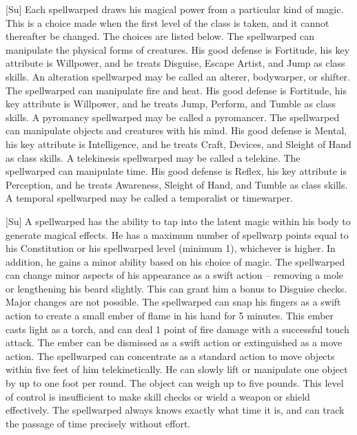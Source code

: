 [Su]
Each spellwarped draws his magical power from a particular kind of magic.
This is a choice made when the first level of the class is taken, and it cannot thereafter be changed.
The choices are listed below.
    The spellwarped can manipulate the physical forms of creatures.
    His good defense is Fortitude, his key attribute is Willpower, and he treats Disguise, Escape Artist, and Jump as class skills.
    An alteration spellwarped may be called an alterer, bodywarper, or shifter.
    The spellwarped can manipulate fire and heat.
    His good defense is Fortitude, his key attribute is Willpower, and he treats Jump, Perform, and Tumble as class skills.
    A pyromancy spellwarped may be called a pyromancer.
    The spellwarped can manipulate objects and creatures with his mind.
    His good defense is Mental, his key attribute is Intelligence, and he treats Craft, Devices, and Sleight of Hand as class skills.
    A telekinesis spellwarped may be called a telekine.
    The spellwarped can manipulate time.
    His good defense is Reflex, his key attribute is Perception, and he treats Awareness, Sleight of Hand, and Tumble as class skills.
    A temporal spellwarped may be called a temporalist or timewarper.

[Su]
A spellwarped has the ability to tap into the latent magic within his body to generate magical effects.
He has a maximum number of spellwarp points equal to his Constitution or his spellwarped level (minimum 1), whichever is higher.
In addition, he gains a minor ability based on his choice of magic.
    The spellwarped can change minor aspects of his appearance as a swift action -- removing a mole or lengthening his beard slightly.
    This can grant him a  bonus to Disguise checks.
    Major changes are not possible.
    The spellwarped can snap his fingers as a swift action to create a small ember of flame in his hand for 5 minutes.
    This ember casts light as a torch, and can deal 1 point of fire damage with a successful touch attack.
    The ember can be dismissed as a swift action or extinguished as a move action.
    The spellwarped can concentrate as a standard action to move objects within five feet of him telekinetically.
    He can slowly lift or manipulate one object by up to one foot per round.
    The object can weigh up to five pounds.
    This level of control is insufficient to make skill checks or wield a weapon or shield effectively.
    The spellwarped always knows exactly what time it is, and can track the passage of time precisely without effort.

